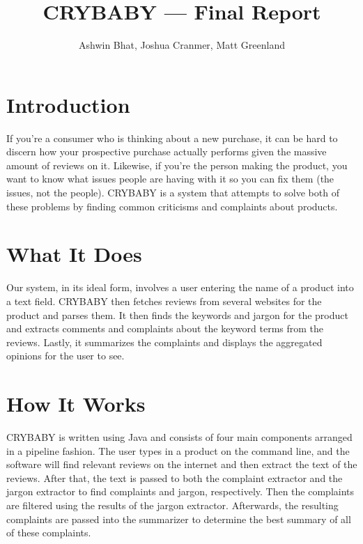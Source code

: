 \documentclass{article}
\title{CRYBABY --- Final Report}
\author{Ashwin Bhat, Joshua Cranmer, Matt Greenland}
\begin{document}
\maketitle
\tableofcontents

\section{Introduction} %

If you're a consumer who is thinking about a new purchase, it can be hard to 
discern how your prospective purchase actually performs given the massive 
amount of reviews on it. Likewise, if you're the person making the product, 
you want to know what issues people are having with it so you can fix them 
(the issues, not the people).  CRYBABY is a system that attempts to solve 
both of these problems by finding common criticisms and complaints about 
products.


\section{What It Does} %

Our system, in its ideal form, involves a user entering the name of a product 
into a text field.  CRYBABY then fetches reviews from several websites for 
the product and parses them.  It then finds the keywords and jargon for the 
product and extracts comments and complaints about the keyword terms from the 
reviews.  Lastly, it summarizes the complaints and displays the aggregated 
opinions for the user to see.


\section{How It Works} %

CRYBABY is written using Java and consists of four main components arranged in
a pipeline fashion. The user types in a product on the command line, and the
software will find relevant reviews on the internet and then extract the text
of the reviews. After that, the text is passed to both the complaint extractor
and the jargon extractor to find complaints and jargon, respectively. Then the
complaints are filtered using the results of the jargon extractor. Afterwards,
the resulting complaints are passed into the summarizer to determine the best
summary of all of these complaints.
\end{document}
